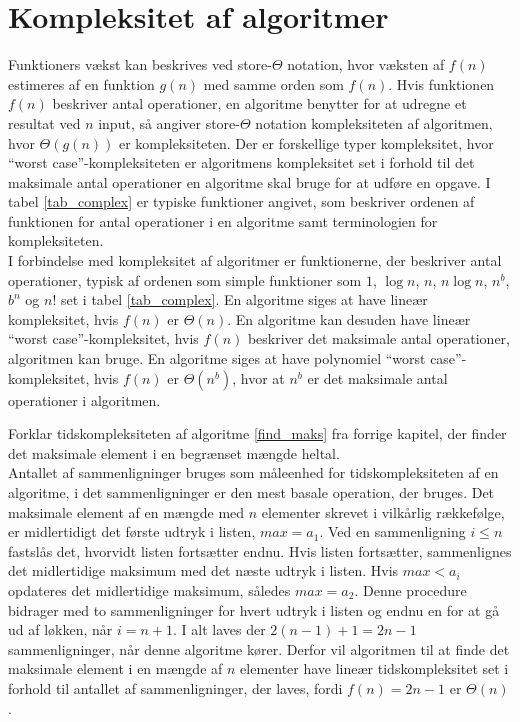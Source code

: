 \section{Kompleksitet af algoritmer}
Funktioners vækst kan beskrives ved store-$\Theta$ notation, hvor væksten af $f(n)$ estimeres af en funktion $g(n)$ med samme orden som $f(n)$. 
Hvis funktionen $f(n)$ beskriver antal operationer, en algoritme benytter for at udregne et resultat ved $n$ input, så angiver store-$\Theta$ notation kompleksiteten af algoritmen, hvor $\Theta(g(n))$ er kompleksiteten. 
Der er forskellige typer kompleksitet, hvor “worst case”-kompleksiteten er algoritmens kompleksitet set i forhold til det maksimale antal operationer en algoritme skal bruge for at udføre en opgave.
I tabel \ref{tab_complex} er typiske funktioner angivet, som beskriver ordenen af funktionen for antal operationer i en algoritme samt terminologien for kompleksiteten.\\



I forbindelse med kompleksitet af algoritmer er funktionerne, der beskriver antal operationer, typisk af ordenen som simple funktioner som $1$, $\log n$, $n$, $n \log n$, $n^b$, $b^n$ og $n!$ set i tabel \ref{tab_complex}. 
En algoritme siges at have lineær kompleksitet, hvis $f(n)$ er $\Theta(n)$. 
En algoritme kan desuden have lineær “worst case”-kompleksitet, hvis $f(n)$ beskriver det maksimale antal operationer, algoritmen kan bruge. 
En algoritme siges at have polynomiel “worst case”-kompleksitet, hvis $f(n)$ er $\Theta(n^b)$, hvor at $n^b$ er det maksimale antal operationer i algoritmen.

\begin{exmp}
Forklar tidskompleksiteten af algoritme \ref{find_maks} fra forrige kapitel, der finder det maksimale element i en begrænset mængde heltal.\\ 
Antallet af sammenligninger bruges som måleenhed for tidskompleksiteten af en algoritme, i det sammenligninger er den mest basale operation, der bruges.
Det maksimale element af en mængde med $n$ elementer skrevet i vilkårlig rækkefølge, er midlertidigt det første udtryk i listen, $max=a_1$. 
Ved en sammenligning $i \leq n$ fastslås det, hvorvidt listen fortsætter endnu. Hvis listen fortsætter, sammenlignes det midlertidige maksimum med det næste udtryk i listen. 
Hvis $max<a_i$ opdateres det midlertidige maksimum, således $max=a_2$.
Denne procedure bidrager med to sammenligninger for hvert udtryk i listen og endnu en for at gå ud af løkken, når $i=n+1$. 
I alt laves der $2(n-1)+1=2n-1$ sammenligninger, når denne algoritme kører. 
Derfor vil algoritmen til at finde det maksimale element i en mængde af $n$ elementer have lineær tidskompleksitet set i forhold til antallet af sammenligninger, der laves, fordi $f(n)=2n-1$ er $\Theta (n)$.  
\end{exmp}
